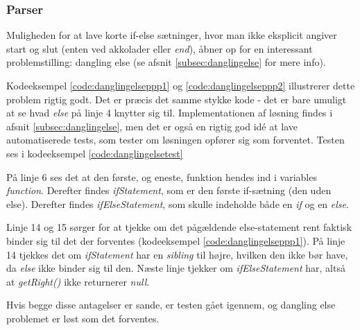 \subsubsection{Parser}
\label{subsec:parser}

Muligheden for at lave korte if-else sætninger, hvor man ikke eksplicit angiver start og slut (enten ved akkolader eller \textit{end}), åbner op for en interessant problemstilling: dangling else (se afsnit \ref{subsec:danglingelse} for mere info). 



\noindent Kodeeksempel \ref{code:danglingelseppp1} og \ref{code:danglingelseppp2} illustrerer dette problem rigtig godt. Det er præcis det samme stykke kode - det er bare umuligt at se hvad \textit{else} på linje 4 knytter sig til. Implementationen af løsning findes i afsnit \ref{subsec:danglingelse}, men det er også en rigtig god idé at lave automatiserede tests, som tester om løsningen opfører sig som forventet. Testen ses i kodeeksempel \ref{code:danglingelsetest}


\noindent På linje 6 ses det at den første, og eneste, funktion hendes ind i variables \textit{function}. Derefter findes \textit{ifStatement}, som er den første if-sætning (den uden else). Derefter findes \textit{ifElseStatement}, som skulle indeholde både en \textit{if} og en \textit{else}.

\noindent Linje 14 og 15 sørger for at tjekke om det pågældende else-statement rent faktisk binder sig til det der forventes (kodeeksempel \ref{code:danglingelseppp1}). På linje 14 tjekkes det om \textit{ifStatement} har en \textit{sibling} til højre, hvilken den ikke bør have, da \textit{else} ikke binder sig til den. Næste linje tjekker om \textit{ifElseStatement} har, altså at \textit{getRight()} ikke returnerer \textit{null}. 

Hvis begge disse antagelser er sande, er testen gået igennem, og dangling else problemet er løst som det forventes.